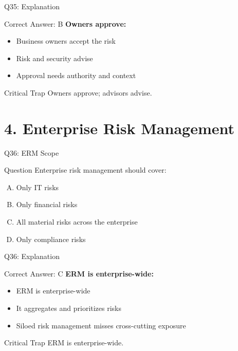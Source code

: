 \documentclass{beamer}
\begin{document}
	\begin{frame}{Q35: Explanation}
		\begin{block}{Correct Answer: B}
			\textbf{Owners approve:}
			\begin{itemize}
				\item Business owners accept the risk
				\item Risk and security advise
				\item Approval needs authority and context
			\end{itemize}
		\end{block}
		\begin{alertblock}{Critical Trap}
			Owners approve; advisors advise.
		\end{alertblock}
	\end{frame}
	
	\section{4. Enterprise Risk Management}
	
	\begin{frame}{Q36: ERM Scope}
		\begin{block}{Question}
			Enterprise risk management should cover:
		\end{block}
		\begin{enumerate}[(A)]
			\item Only IT risks
			\item Only financial risks
			\item All material risks across the enterprise
			\item Only compliance risks
		\end{enumerate}
	\end{frame}
	
	\begin{frame}{Q36: Explanation}
		\begin{block}{Correct Answer: C}
			\textbf{ERM is enterprise-wide:}
			\begin{itemize}
				\item ERM is enterprise-wide
				\item It aggregates and prioritizes risks
				\item Siloed risk management misses cross-cutting exposure
			\end{itemize}
		\end{block}
		\begin{alertblock}{Critical Trap}
			ERM is enterprise-wide.
		\end{alertblock}
	\end{frame}
	
\end{document}

